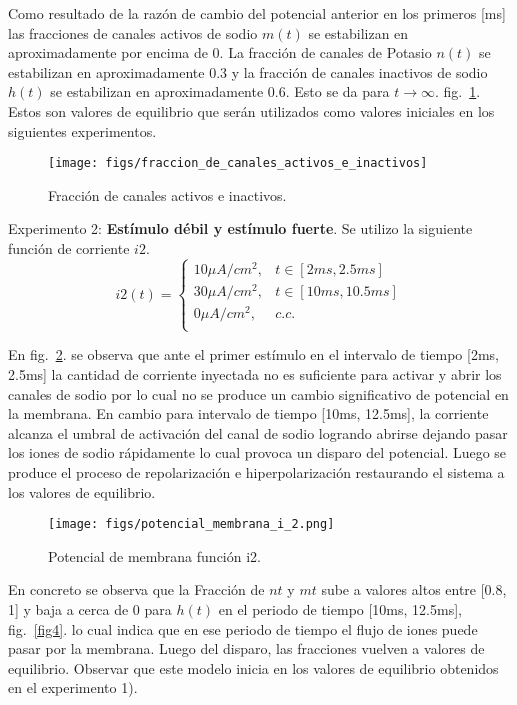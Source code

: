 \documentclass[aps,prl,twocolumn,groupedaddress]{revtex4-2}
\begin{document}
Como resultado de la razón de cambio del potencial anterior en los primeros [ms] las fracciones de canales activos de sodio $m(t)$ se estabilizan en aproximadamente por encima de 0. La fracción de canales de Potasio $n(t)$ se estabilizan en aproximadamente 0.3 y la fracción de canales inactivos de sodio $h(t)$ se estabilizan en aproximadamente 0.6. Esto se da para ${t \to \infty}$. fig.~\ref{fig2}. Estos son valores de equilibrio que serán utilizados como valores iniciales en los siguientes experimentos.\\


\begin{figure}[h!]
\centering
\texttt{[image: figs/fraccion\_de\_canales\_activos\_e\_inactivos]}
\caption{Fracción de canales activos e inactivos. \label{fig2}}
\end{figure}


Experimento 2: \textbf{Estímulo débil y estímulo fuerte}. Se utilizo la siguiente función de corriente $i2$.\\
$$
i2(t) = \left\{
\begin{array}{ll}
10 \mu A/cm^2, & t\in [2ms, 2.5ms] \\
30 \mu A/cm^2, & t\in [10ms, 10.5ms] \\
0 \mu A/cm^2, & c.c. \\
\end{array}
\right.
$$

En fig.~\ref{fig3}. se observa que ante el primer estímulo en el intervalo de tiempo [2ms, 2.5ms] la cantidad de corriente inyectada no es suficiente para activar y abrir los canales de sodio por lo cual no se produce un cambio significativo de potencial en la membrana. En cambio para intervalo de tiempo [10ms, 12.5ms], la corriente alcanza el umbral de activación del canal de sodio logrando abrirse dejando pasar los iones de sodio rápidamente lo cual provoca un disparo del potencial. Luego se produce el proceso de repolarización e hiperpolarización  restaurando el sistema a los valores de equilibrio.\\


\begin{figure}[h!]
\centering
\texttt{[image: figs/potencial\_membrana\_i\_2.png]}
\caption{Potencial de membrana función i2. \label{fig3}}
\end{figure}

En concreto se observa que la Fracción de $nt$ y $mt$ sube a valores altos entre [0.8, 1] y baja a cerca de  0 para $h(t)$ en el periodo de tiempo [10ms, 12.5ms],
fig.~\ref{fig4}. lo cual indica que en ese periodo de tiempo el flujo de iones puede pasar por la membrana.
Luego del disparo, las fracciones vuelven a valores de equilibrio.
Observar que este modelo inicia en los valores de equilibrio obtenidos en el experimento 1).\\
\end{document}
